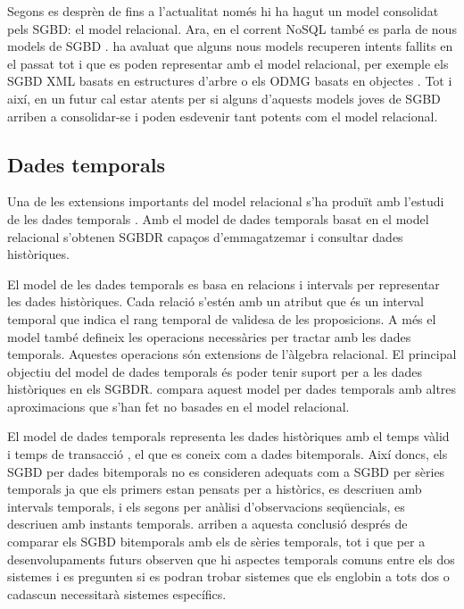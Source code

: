 Segons es desprèn de \textcite{date06} fins a l'actualitat només hi ha
hagut un model consolidat pels SGBD: el model relacional.  Ara, en el
corrent NoSQL també es parla de nous models de
SGBD \parencite{edlich:nosql,stonebraker09:scidb}.
\citeauthor{date06} ha avaluat que alguns nous models recuperen
intents fallits en el passat tot i que es poden representar amb el
model relacional, per exemple els SGBD XML basats en estructures
d'arbre \parencite[cap.~14]{date06} o els ODMG basats en
objectes \parencite[cap.~27]{date06}. Tot i així, en un futur cal
estar atents per si alguns d'aquests models joves de SGBD arriben a
consolidar-se i poden esdevenir tant potents com el model relacional.





\subsection{Dades temporals}


Una de les extensions importants del model relacional s'ha produït amb
l'estudi de les dades
temporals \parencite{date02:_tempor_data_relat_model}. Amb el model de
dades temporals basat en el model relacional s'obtenen SGBDR capaços
d'emmagatzemar i consultar dades històriques.

El model de les dades
temporals \parencite{date02:_tempor_data_relat_model} es basa en
relacions i intervals per representar les dades històriques. Cada
relació s'estén amb un atribut que és un interval temporal que indica
el rang temporal de validesa de les proposicions. A més el model també
defineix les operacions necessàries per tractar amb les dades
temporals. Aquestes operacions són extensions de l'àlgebra relacional.
El principal objectiu del model de dades temporals és poder tenir
suport per a les dades històriques en els SGBDR.
\textcite[cap.~28]{date06} compara aquest model per dades temporals
amb altres aproximacions que s'han fet no basades en el model
relacional.



El model de dades temporals representa les dades històriques amb el
temps vàlid i temps de
transacció \parencite[cap.~15]{date02:_tempor_data_relat_model}, el
que es coneix com a dades bitemporals.  Així doncs, els SGBD per dades
bitemporals no es consideren adequats com a SGBD per sèries temporals
ja que els primers estan pensats per a històrics, es descriuen amb
intervals temporals, i els segons per anàlisi d'observacions
seqüencials, es descriuen amb instants temporals.
\textcite{schmidt95} arriben a aquesta conclusió després de comparar
els SGBD bitemporals amb els de sèries temporals, tot i que per a
desenvolupaments futurs observen que hi aspectes temporals comuns
entre els dos sistemes i es pregunten si es podran trobar sistemes que
els englobin a tots dos o cadascun necessitarà sistemes específics.


